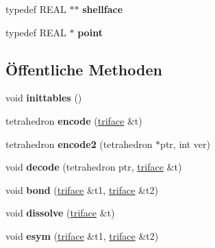 \begin{DoxyCompactItemize}
\item 
\hypertarget{classtetgenmesh_ad4860123b88783b943fa6452e886a2cb}{typedef R\-E\-A\-L $\ast$$\ast$ {\bfseries shellface}}\label{classtetgenmesh_ad4860123b88783b943fa6452e886a2cb}

\item 
\hypertarget{classtetgenmesh_ace3fb4f80389185b7c9b18ab69a3dea2}{typedef R\-E\-A\-L $\ast$ {\bfseries point}}\label{classtetgenmesh_ace3fb4f80389185b7c9b18ab69a3dea2}

\end{DoxyCompactItemize}
\subsection*{Öffentliche Methoden}
\begin{DoxyCompactItemize}
\item 
\hypertarget{classtetgenmesh_af1a7205fe0e5e6256f301e6c47b752b6}{void {\bfseries inittables} ()}\label{classtetgenmesh_af1a7205fe0e5e6256f301e6c47b752b6}

\item 
\hypertarget{classtetgenmesh_a7c32f356cc7f0e57f442f9dac4fccb8a}{tetrahedron {\bfseries encode} (\hyperlink{classtetgenmesh_1_1triface}{triface} \&t)}\label{classtetgenmesh_a7c32f356cc7f0e57f442f9dac4fccb8a}

\item 
\hypertarget{classtetgenmesh_a2bc1e8e424ea557d033135dafcf165bb}{tetrahedron {\bfseries encode2} (tetrahedron $\ast$ptr, int ver)}\label{classtetgenmesh_a2bc1e8e424ea557d033135dafcf165bb}

\item 
\hypertarget{classtetgenmesh_a809cfdec35ae9a52670e045823a302c0}{void {\bfseries decode} (tetrahedron ptr, \hyperlink{classtetgenmesh_1_1triface}{triface} \&t)}\label{classtetgenmesh_a809cfdec35ae9a52670e045823a302c0}

\item 
\hypertarget{classtetgenmesh_ad7b47aeb5b8d5ab677d86fcafa619a35}{void {\bfseries bond} (\hyperlink{classtetgenmesh_1_1triface}{triface} \&t1, \hyperlink{classtetgenmesh_1_1triface}{triface} \&t2)}\label{classtetgenmesh_ad7b47aeb5b8d5ab677d86fcafa619a35}

\item 
\hypertarget{classtetgenmesh_ac0e0919c3b91b0e55dadbdaae2554074}{void {\bfseries dissolve} (\hyperlink{classtetgenmesh_1_1triface}{triface} \&t)}\label{classtetgenmesh_ac0e0919c3b91b0e55dadbdaae2554074}

\item 
\hypertarget{classtetgenmesh_a523cfafc3be8e0ead97a13707b33e4b3}{void {\bfseries esym} (\hyperlink{classtetgenmesh_1_1triface}{triface} \&t1, \hyperlink{classtetgenmesh_1_1triface}{triface} \&t2)}\label{classtetgenmesh_a523cfafc3be8e0ead97a13707b33e4b3}


\end{DoxyCompactItemize}
